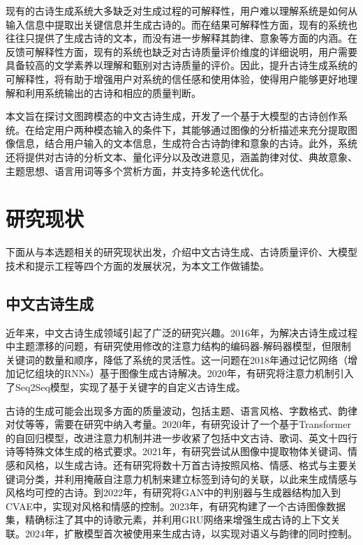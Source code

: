 现有的古诗生成系统大多缺乏对生成过程的可解释性，用户难以理解系统是如何从输入信息中提取出关键信息并生成古诗的。而在结果可解释性方面，现有的系统也往往只提供了生成古诗的文本，而没有进一步解释其韵律、意象等方面的内涵。在反馈可解释性方面，现有的系统也缺乏对古诗质量评价维度的详细说明，用户需要具备较高的文学素养以理解和甄别对古诗质量的评价。因此，提升古诗生成系统的可解释性，将有助于增强用户对系统的信任感和使用体验，使得用户能够更好地理解和利用系统输出的古诗和相应的质量判断。

本文旨在探讨文图跨模态的中文古诗生成，开发了一个基于大模型的古诗创作系统。在给定用户两种模态输入的条件下，其能够通过图像的分析描述来充分提取图像信息，结合用户输入的文本信息，生成符合古诗韵律和意象的古诗。此外，系统还将提供对古诗的分析文本、量化评分以及改进意见，涵盖韵律对仗、典故意象、主题思想、语言用词等多个赏析方面，并支持多轮迭代优化。

\section{研究现状}

下面从与本选题相关的研究现状出发，介绍中文古诗生成、古诗质量评价、大模型技术和提示工程等四个方面的发展状况，为本文工作做铺垫。

\subsection{中文古诗生成}
近年来，中文古诗生成领域引起了广泛的研究兴趣。2016年，为解决古诗生成过程中主题漂移的问题，有研究使用修改的注意力结构的编码器-解码器模型，但限制关键词的数量和顺序，降低了系统的灵活性。这一问题在2018年通过记忆网络（增加记忆组块的RNNs）基于图像生成古诗解决。2020年，有研究将注意力机制引入了Seq2Seq模型，实现了基于关键字的自定义古诗生成。

古诗的生成可能会出现多方面的质量波动，包括主题、语言风格、字数格式、韵律对仗等等，需要在研究中纳入考量。2020年，有研究设计了一个基于Transformer的自回归模型，改进注意力机制并进一步收紧了包括中文古诗、歌词、英文十四行诗等特殊文体生成的格式要求。2021年，有研究尝试从图像中提取物体关键词、情感和风格，以生成古诗。还有研究将数十万首古诗按照风格、情感、格式与主要关键词分类，并利用掩蔽自注意力机制来建立标签到诗句的关联，以此来生成情感与风格均可控的古诗。到2022年，有研究将GAN中的判别器与生成器结构加入到CVAE中，实现对风格和情感的控制。2023年，有研究构建了一个古诗图像数据集，精确标注了其中的诗歌元素，并利用GRU网络来增强生成古诗的上下文关联。2024年，扩散模型首次被使用来生成古诗，以实现对语义与韵律的同时控制。


